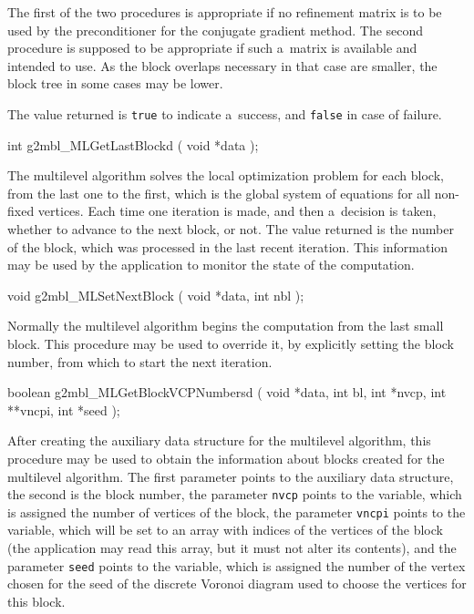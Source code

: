 The first of the two procedures is appropriate if no refinement matrix is to
be used by the preconditioner for the conjugate gradient method. The second
procedure is supposed to be appropriate if such a~matrix is available and
intended to use. As the block overlaps necessary in that case are smaller,
the block tree in some cases may be lower.

The value returned is \texttt{true} to indicate a~success, and \texttt{false}
in case of failure.

\medskip
\begin{listingC}
int g2mbl_MLGetLastBlockd ( void *data );
\end{listingC}
The multilevel algorithm solves the local optimization problem for each
block, from the last one to the first, which is the global system of
equations for all non-fixed vertices. Each time one iteration is made, and
then a~decision is taken, whether to advance to the next block, or not. The
value returned is the number of the block, which was processed in the last
recent iteration. This information may be used by the application to monitor
the state of the computation.

\medskip
\begin{listingC}
void g2mbl_MLSetNextBlock ( void *data, int nbl );
\end{listingC}
Normally the multilevel algorithm begins the computation from the last small
block. This procedure may be used to override it, by explicitly setting the
block number, from which to start the next iteration.

\medskip
\begin{listingC}
boolean g2mbl_MLGetBlockVCPNumbersd ( void *data, int bl,
                                int *nvcp, int **vncpi, int *seed );
\end{listingC}
After creating the auxiliary data structure for the multilevel algorithm,
this procedure may be used to obtain the information about blocks created
for the multilevel algorithm. The first parameter points to the auxiliary
data structure, the second is the block number, the parameter \texttt{nvcp}
points to the variable, which is assigned the number of vertices of the
block, the parameter \texttt{vncpi} points to the variable, which will be
set to an array with indices of the vertices of the block (the application
may read this array, but it must not alter its contents), and the parameter
\texttt{seed} points to the variable, which is assigned the number of the
vertex chosen for the seed of the discrete Voronoi diagram used to choose
the vertices for this block.


